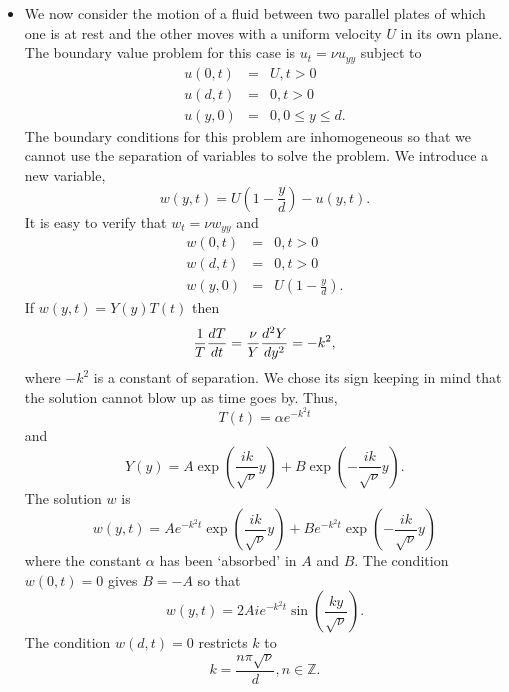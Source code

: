 \begin{itemize}
\item We now consider the motion of a fluid between two parallel plates of which one is at rest and the other
moves with a uniform velocity $U$ in its own plane. The boundary value problem for this case is $u_t = \nu u_{yy}$
subject to
\begin{eqnarray*}
u(0, t) &=& U, t > 0 \\
u(d, t) &=& 0, t > 0 \\
u(y, 0) &=& 0, 0 \le y \le d.
\end{eqnarray*}
The boundary conditions for this problem are inhomogeneous so that we cannot use the separation of variables to
solve the problem. We introduce a new variable,
\begin{equation}\label{c4s3e19}
w(y, t) = U\left(1 - \frac{y}{d}\right) - u(y, t).
\end{equation}
It is easy to verify that $w_t = \nu w_{yy}$ and
\begin{eqnarray*}
w(0, t) &=& 0, t > 0 \\
w(d, t) &=& 0, t > 0 \\
w(y, 0) &=& U\left(1 - \frac{y}{d}\right).
\end{eqnarray*}
If $w(y, t) = Y(y)T(t)$ then
\[
\frac{1}{T}\frac{d{T}}{d{t}} = \frac{\nu}{Y}\frac{d^2Y}{dy^2} = -k^2,
\]
where $-k^2$ is a constant of separation. We chose its sign keeping in mind that the solution cannot blow up
as time goes by. Thus,
\begin{equation}\label{c4s3e20}
T(t) = \alpha e^{-k^2 t}
\end{equation}
and
\begin{equation}\label{c4s3e21}
Y(y) = A\exp\left(\frac{ik}{\sqrt{\nu}}y\right) + B\exp\left(-\frac{ik}{\sqrt{\nu}}y\right).
\end{equation}
The solution $w$ is
\begin{equation}\label{c4s3e22}
w(y, t) = Ae^{-k^2 t}\exp\left(\frac{ik}{\sqrt{\nu}}y\right) + Be^{-k^2 t}\exp\left(-\frac{ik}{\sqrt{\nu}}y\right)
\end{equation}
where the constant $\alpha$ has been `absorbed' in $A$ and $B$. The condition $w(0, t) = 0$ gives $B = -A$ so that
\begin{equation}\label{c4s3e23}
w(y, t) = 2Aie^{-k^2 t}\sin\left(\frac{ky}{\sqrt{\nu}}\right).
\end{equation}
The condition $w(d, t) = 0$ restricts $k$ to
\begin{equation}\label{c4s3e24}
k = \frac{n\pi\sqrt{\nu}}{d}, n \in \mathbb{Z}.
\end{equation}

\end{itemize}
